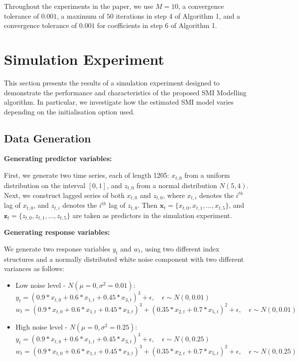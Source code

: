 \documentclass[
  11pt,
  a4paper,
]{report}
\begin{document}
Throughout the experiments in the paper, we use \(M = 10\), a
convergence tolerance of \(0.001\), a maximum of \(50\) iterations in
step 4 of Algorithm 1, and a convergence tolerance of \(0.001\) for
coefficients in step 6 of Algorithm 1.

\section{Simulation Experiment}\label{sec-simulation}

This section presents the results of a simulation experiment designed to
demonstrate the performance and characteristics of the proposed SMI
Modelling algorithm. In particular, we investigate how the estimated SMI
model varies depending on the initialisation option used.

\subsection{Data Generation}\label{sec-datagen}

\textbf{Generating predictor variables:}

First, we generate two time series, each of length 1205: \(x_{t,0}\)
from a uniform distribution on the interval \([0, 1]\), and \(z_{t,0}\)
from a normal distribution \(N(5, 4)\). Next, we construct lagged series
of both \(x_{t,0}\) and \(z_{t,0}\), where \(x_{t,i}\) denotes the
\(i^{th}\) lag of \(x_{t,0}\), and \(z_{t,i}\) denotes the \(i^{th}\)
lag of \(z_{t,0}\). Then
\(\bm{x}_t = \{x_{t,0}, x_{t,1}, \dots, x_{t,5}\}\), and
\(\bm{z}_t = \{z_{t,0}, z_{t,1}, \dots, z_{t,5}\}\) are taken as
predictors in the simulation experiment.

\textbf{Generating response variables:}

We generate two response variables \(y_{t}\) and \(w_{t}\), using two
different index structures and a normally distributed white noise
component with two different variances as follows:

\begin{itemize}
\item
  Low noise level - \(N(\mu = 0, \sigma^2 = 0.01)\):\\
  \(y_{t} = (0.9*x_{t,0} + 0.6*x_{1,t} + 0.45*x_{3,t})^3 + \epsilon, \quad \epsilon\sim N(0, 0.01)\)\\
  \(w_{t} = (0.9*x_{t,0} + 0.6*x_{1,t} + 0.45*x_{3,t})^3 + (0.35*x_{2,t} + 0.7*x_{5,t})^2 + \epsilon, \quad \epsilon\sim N(0, 0.01)\)
\item
  High noise level - \(N(\mu = 0, \sigma^2 = 0.25)\):\\
  \(y_{t} = (0.9*x_{t,0} + 0.6*x_{1,t} + 0.45*x_{3,t})^3 + \epsilon, \quad \epsilon\sim N(0, 0.25)\)\\
  \(w_{t} = (0.9*x_{t,0} + 0.6*x_{1,t} + 0.45*x_{3,t})^3 + (0.35*x_{2,t} + 0.7*x_{5,t})^2 + \epsilon, \quad \epsilon\sim N(0, 0.25)\)
\end{itemize}
\end{document}
